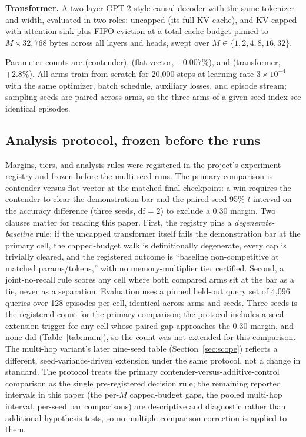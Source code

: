 \documentclass{article}
\begin{document}
\textbf{Transformer.} A two-layer GPT-2-style causal decoder with the same
tokenizer and width, evaluated in two roles: uncapped (its full KV cache),
and KV-capped with attention-sink-plus-FIFO eviction
\citep{xiao2023efficient} at a total cache budget pinned to
$M \times 32{,}768$ bytes across all layers and heads, swept over
$M \in \{1, 2, 4, 8, 16, 32\}$. %

Parameter counts are \nparamscontender{} (contender), \nparamsablation{}
(flat-vector, $-0.007\%$), and \nparamstransformer{} (transformer,
$+2.8\%$). %
All arms train from scratch for 20{,}000 steps at learning rate
$3 \times 10^{-4}$ with the same optimizer, batch schedule, auxiliary
losses, and episode stream; sampling seeds are paired across arms, so the
three arms of a given seed index see identical
episodes. %

\subsection{Analysis protocol, frozen before the runs}

Margins, tiers, and analysis rules were registered in the project's
experiment registry and frozen before the multi-seed runs. The primary
comparison is contender versus flat-vector at the matched final
checkpoint: a win requires the contender to clear the demonstration bar
and the paired-seed 95\% $t$-interval on the accuracy difference (three
seeds, $\mathrm{df}=2$) to exclude a 0.30 margin. Two clauses matter for
reading this paper. First, the registry pins a \emph{degenerate-baseline}
rule: if the uncapped transformer itself fails the demonstration bar at
the primary cell, the capped-budget walk is definitionally degenerate,
every cap is trivially cleared, and the registered outcome is ``baseline
non-competitive at matched params/tokens,'' with no memory-multiplier tier
certified. Second, a joint-no-recall rule scores any cell where both
compared arms sit at the bar as a tie, never as a separation. Evaluation
uses a pinned held-out query set of 4{,}096 queries over 128 episodes per
cell, %
identical across arms and seeds. Three seeds is the registered count for
the primary comparison; the protocol includes a seed-extension trigger
for any cell whose paired gap approaches the 0.30 margin, and none did
(Table~\ref{tab:main}), %
so the count was not extended for this comparison. The multi-hop
variant's later nine-seed table (Section~\ref{sec:scope}) reflects a
different, seed-variance-driven extension under the same protocol, not a
change in standard. The protocol treats the primary
contender-versus-additive-control comparison as the single
pre-registered decision rule; the remaining reported intervals in this
paper (the per-$M$ capped-budget gaps, the pooled multi-hop interval,
per-seed bar comparisons) are descriptive and diagnostic rather than
additional hypothesis tests, so no multiple-comparison correction is
applied to them.
\end{document}
